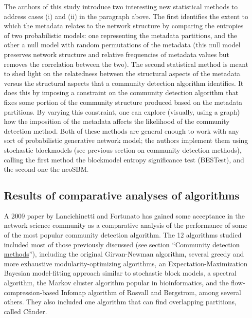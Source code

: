 The authors of this study introduce two interesting new statistical
methods to address cases (i) and (ii) in the paragraph above. The first
identifies the extent to which the metadata relates to the network
structure by comparing the entropies of two probabilistic models: one
representing the metadata partitions, and the other a null model with
random permutations of the metadata (this null model preserves network
structure and relative frequencies of metadata values but removes the
correlation between the two). The second statistical method is meant to
shed light on the relatedness between the structural aspects of the
metadata versus the structural aspects that a community detection
algorithm identifies. It does this by imposing a constraint on the
community detection algorithm that fixes some portion of the community
structure produced based on the metadata partitions. By varying this
constraint, one can explore (visually, using a graph) how the imposition
of the metadata affects the likelihood of the community detection
method. Both of these methods are general enough to work with any sort
of probabilistic generative network model; the authors implement them
using stochastic blockmodels (see previous section on community
detection methods), calling the first method the blockmodel entropy
significance test (BESTest), and the second one the neoSBM.

\subsection{Results of comparative analyses of
algorithms}\label{results-of-comparative-analyses-of-algorithms}

A 2009 paper by Lancichinetti and Fortunato
\autocite{lancichinetti_community_2009} has gained some acceptance in
the network science community as a comparative analysis of the
performance of some of the most popular community detection algorithm.
The 12 algorithms studied included most of those previously discussed
(see section ``\protect\hyperlink{community-detection-methods}{Community
detection methods}''), including the original Girvan-Newman algorithm,
several greedy and more exhaustive modularity-optimizing algorithms, an
Expectation-Maximization Bayesian model-fitting approach similar to
stochastic block models, a spectral algorithm, the Markov cluster
algorithm popular in bioinformatics, and the flow-compression-based
Infomap algorithm of Rosvall and Bergstrom, among several others. They
also included one algorithm that can find overlapping partitions, called
Cfinder.

